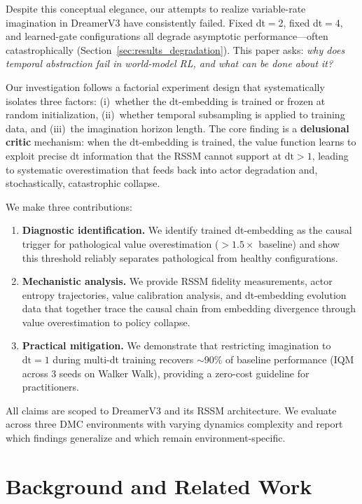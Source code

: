 \documentclass[letterpaper]{article}
\begin{document}
Despite this conceptual elegance, our attempts to realize variable-rate imagination in DreamerV3 have consistently failed.
Fixed dt$=$2, fixed dt$=$4, and learned-gate configurations all degrade asymptotic performance---often catastrophically (Section~\ref{sec:results_degradation}).
This paper asks: \emph{why does temporal abstraction fail in world-model RL, and what can be done about it?}

Our investigation follows a factorial experiment design that systematically isolates three factors: (i)~whether the dt-embedding is trained or frozen at random initialization, (ii)~whether temporal subsampling is applied to training data, and (iii)~the imagination horizon length.
The core finding is a \textbf{delusional critic} mechanism: when the dt-embedding is trained, the value function learns to exploit precise dt information that the RSSM cannot support at $\text{dt}>1$, leading to systematic overestimation that feeds back into actor degradation and, stochastically, catastrophic collapse.

We make three contributions:
\begin{enumerate}
    \item \textbf{Diagnostic identification.} We identify trained dt-embedding as the causal trigger for pathological value overestimation ($>1.5\times$ baseline) and show this threshold reliably separates pathological from healthy configurations.
    \item \textbf{Mechanistic analysis.} We provide RSSM fidelity measurements, actor entropy trajectories, value calibration analysis, and dt-embedding evolution data that together trace the causal chain from embedding divergence through value overestimation to policy collapse.
    \item \textbf{Practical mitigation.} We demonstrate that restricting imagination to $\text{dt}=1$ during multi-dt training recovers $\sim$90\% of baseline performance (IQM across 3 seeds on Walker Walk), providing a zero-cost guideline for practitioners.
\end{enumerate}

All claims are scoped to DreamerV3 and its RSSM architecture.
We evaluate across three DMC environments with varying dynamics complexity and report which findings generalize and which remain environment-specific.

\section{Background and Related Work}
\label{sec:related}
\end{document}
